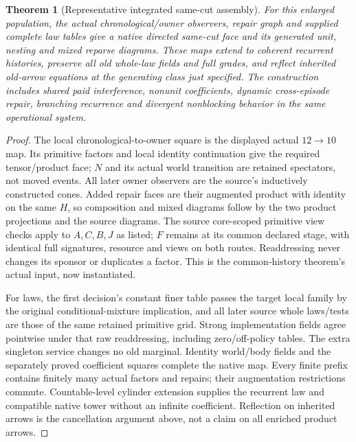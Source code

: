 \documentclass{article}
\newtheorem{theorem}{Theorem}\newtheorem{proposition}{Proposition}
\begin{document}
\begin{theorem}[Representative integrated same-cut assembly]
For this enlarged population, the actual chronological/owner observers, repair graph and supplied complete law tables give a native directed same-cut face and its generated unit, nesting and mixed reparse diagrams. These maps extend to coherent recurrent histories, preserve all old whole-law fields and full grades, and reflect inherited old-arrow equations at the generating class just specified. The construction includes shared paid interference, nonunit coefficients, dynamic cross-episode repair, branching recurrence and divergent nonblocking behavior in the same operational system.
\end{theorem}
\begin{proof}
The local chronological-to-owner square is the displayed actual $12\to10$ map. Its primitive factors and local identity continuation give the required tensor/product face; $N$ and its actual world transition are retained spectators, not moved events. All later owner observers are the source's inductively constructed cones. Added repair faces are their augmented product with identity on the same $H$, so composition and mixed diagrams follow by the two product projections and the source diagrams. The source core-scoped primitive view checks apply to $A,C,B,J$ as listed; $F$ remains at its common declared stage, with identical full signatures, resource and views on both routes. Readdressing never changes its sponsor or duplicates a factor. This is the common-history theorem's actual input, now instantiated.

For laws, the first decision's constant finer table passes the target local family by the original conditional-mixture implication, and all later source whole laws/tests are those of the same retained primitive grid. Strong implementation fields agree pointwise under that raw readdressing, including zero/off-policy tables. The extra singleton service changes no old marginal. Identity world/body fields and the separately proved coefficient squares complete the native map. Every finite prefix contains finitely many actual factors and repairs; their augmentation restrictions commute. Countable-level cylinder extension supplies the recurrent law and compatible native tower without an infinite coefficient. Reflection on inherited arrows is the cancellation argument above, not a claim on all enriched product arrows.\end{proof}
\end{document}
